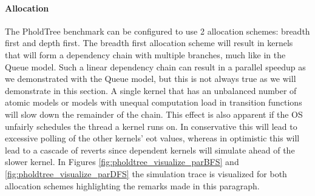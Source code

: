 \paragraph*{Allocation}\label{PholdTreeallocation}
The PholdTree benchmark can be configured to use 2 allocation schemes: breadth first and depth first. 
The breadth first allocation scheme will result in kernels that will form a dependency chain with multiple branches, much like in the Queue model. 
Such a linear dependency chain can result in a parallel speedup as we demonstrated with the Queue model, but this is not always true as we will demonstrate in this section. 
A single kernel that has an unbalanced number of atomic models or models with unequal computation load in transition functions will slow down the remainder of the chain. This effect is also apparent if the OS unfairly schedules the thread a kernel runs on. In conservative this will lead to excessive polling of the other kernels' eot values, whereas in optimistic this will lead to a cascade of reverts since dependent kernels will simulate ahead of the slower kernel. In Figures \ref{fig:pholdtree_visualize_parBFS} and \ref{fig:pholdtree_visualize_parDFS} the simulation trace is visualized for both allocation schemes highlighting the remarks made in this paragraph.
%
%	
%	


